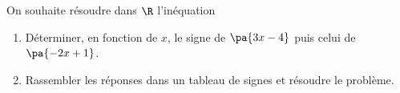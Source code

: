 \begin{exo}{}
	On souhaite résoudre dans $\R$ l'inéquation 
	\begin{enumerate}
		\item Déterminer, en fonction de $x$, le signe de $\pa{3x - 4}$ puis celui de $\pa{-2x + 1}$.
		\item Rassembler les réponses dans un tableau de signes et résoudre le problème.
	\end{enumerate}
\end{exo}

